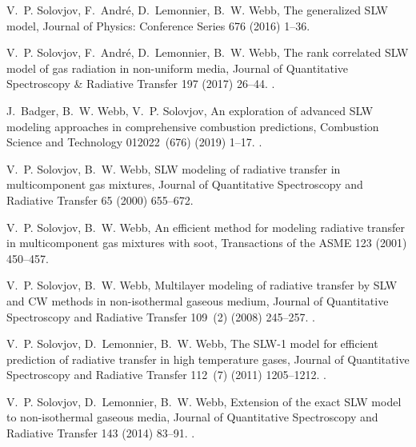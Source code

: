 \documentclass[preprint,12pt]{elsarticle}
\begin{document}
\begin{thebibliography}{10}
V.~P. Solovjov, F.~Andr{\'e}, D.~Lemonnier, B.~W. Webb, The generalized {SLW}
  model, Journal of Physics: Conference Series 676 (2016) 1--36.

V.~P. Solovjov, F.~Andr{\'e}, D.~Lemonnier, B.~W. Webb, The rank correlated
  {SLW} model of gas radiation in non-uniform media, Journal of Quantitative
  Spectroscopy {\&} Radiative Transfer 197 (2017) 26--44.
\newblock \href {http://dx.doi.org/10.1016/j.jqsrt.2017.01.034}
  {}.

J.~Badger, B.~W. Webb, V.~P. Solovjov, An exploration of advanced {SLW}
  modeling approaches in comprehensive combustion predictions, Combustion
  Science and Technology 012022~(676) (2019) 1--17.
\newblock \href {http://dx.doi.org/10.1080/00102202.2019.1678907}
  {}.

V.~P. Solovjov, B.~W. Webb, {SLW} modeling of radiative transfer in
  multicomponent gas mixtures, Journal of Quantitative Spectroscopy and
  Radiative Transfer 65 (2000) 655--672.

V.~P. Solovjov, B.~W. Webb, An efficient method for modeling radiative transfer
  in multicomponent gas mixtures with soot, Transactions of the ASME 123 (2001)
  450--457.

V.~P. Solovjov, B.~W. Webb, Multilayer modeling of radiative transfer by {SLW}
  and {CW} methods in non-isothermal gaseous medium, Journal of Quantitative
  Spectroscopy and Radiative Transfer 109~(2) (2008) 245--257.
\newblock \href {http://dx.doi.org/10.1016/j.jqsrt.2007.08.015}
  {}.

V.~P. Solovjov, D.~Lemonnier, B.~W. Webb, The {SLW}-1 model for efficient
  prediction of radiative transfer in high temperature gases, Journal of
  Quantitative Spectroscopy and Radiative Transfer 112~(7) (2011) 1205--1212.
\newblock \href {http://dx.doi.org/10.1016/j.jqsrt.2010.08.009}
  {}.

V.~P. Solovjov, D.~Lemonnier, B.~W. Webb, Extension of the exact {SLW} model to
  non-isothermal gaseous media, Journal of Quantitative Spectroscopy and
  Radiative Transfer 143 (2014) 83--91.
\newblock \href {http://dx.doi.org/10.1016/j.jqsrt.2013.10.008}
  {}.


\end{thebibliography}
\end{document}

